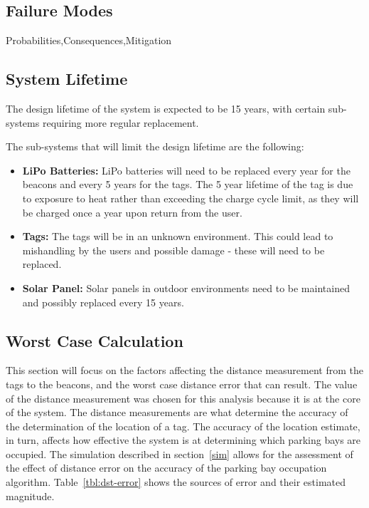 \subsection{Failure Modes}
Probabilities,Consequences,Mitigation

\newpage
\subsection{System Lifetime}
The design lifetime of the system is expected to be 15 years, with certain sub-systems requiring more regular replacement. 

The sub-systems that will limit the design lifetime are the following:
\begin{itemize}
\item \textbf{LiPo Batteries:} LiPo batteries will need to be replaced every year for the beacons and every 5 years for the tags. The 5 year lifetime of the tag is due to exposure to heat rather than exceeding the charge cycle limit, as they will be charged once a year upon return from the user. 
\item \textbf{Tags:} The tags will be in an unknown environment. This could lead to mishandling by the users and possible damage - these will need to be replaced.
\item \textbf{Solar Panel:} Solar panels in outdoor environments need to be maintained and possibly replaced every 15 years. 
\end{itemize}

\subsection{Worst Case Calculation}
This section will focus on the factors affecting the distance measurement from the tags to the beacons,
and the worst case distance error that can result. The value of the distance measurement was chosen
for this analysis because it is at the core of the system. The distance measurements are what determine
the accuracy of the determination of the location of a tag. The accuracy of the location estimate, in turn,
affects how effective the system is at determining which parking bays are occupied. The simulation
described in section~\ref{sim} allows for the assessment of the effect of distance error on the accuracy of
the parking bay occupation algorithm. Table~\ref{tbl:dst-error} shows the sources of error and their estimated
magnitude.

